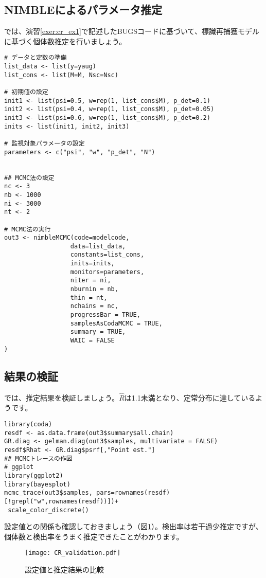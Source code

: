 	\subsection{NIMBLEによるパラメータ推定}
では、演習\ref{exer:cr_ex1}で記述したBUGSコードに基づいて、標識再捕獲モデルに基づく個体数推定を行いましょう。

\begin{verbatim}
# データと定数の準備
list_data <- list(y=yaug)
list_cons <- list(M=M, Nsc=Nsc)

# 初期値の設定
init1 <- list(psi=0.5, w=rep(1, list_cons$M), p_det=0.1)
init2 <- list(psi=0.4, w=rep(1, list_cons$M), p_det=0.05)
init3 <- list(psi=0.6, w=rep(1, list_cons$M), p_det=0.2)
inits <- list(init1, init2, init3)

# 監視対象パラメータの設定
parameters <- c("psi", "w", "p_det", "N")


## MCMC法の設定
nc <- 3
nb <- 1000
ni <- 3000
nt <- 2

# MCMC法の実行
out3 <- nimbleMCMC(code=modelcode,
                  data=list_data,
                  constants=list_cons,
                  inits=inits,
                  monitors=parameters,
                  niter = ni,
                  nburnin = nb,
                  thin = nt,
                  nchains = nc,
                  progressBar = TRUE,
                  samplesAsCodaMCMC = TRUE,
                  summary = TRUE,
                  WAIC = FALSE
)
\end{verbatim}

	\subsection{結果の検証}
では、推定結果を検証しましょう。$\hat{R}$は1.1未満となり、定常分布に達しているようです。
\begin{verbatim}
library(coda)
resdf <- as.data.frame(out3$summary$all.chain)
GR.diag <- gelman.diag(out3$samples, multivariate = FALSE)
resdf$Rhat <- GR.diag$psrf[,"Point est."]
## MCMCトレースの作図
# ggplot
library(ggplot2)
library(bayesplot)
mcmc_trace(out3$samples, pars=rownames(resdf)[!grepl("w",rownames(resdf))])+
 scale_color_discrete()
\end{verbatim}
設定値との関係も確認しておきましょう（図\ref{CR_validation}）。検出率は若干過少推定ですが、個体数と検出率をうまく推定できたことがわかります。
\begin{figure}[htb]
\begin{center}
\graphicspath{{4_hm/figs/}}
\texttt{[image: CR\_validation.pdf]}\\
\caption{設定値と推定結果の比較}
\label{CR_validation}
\end{center}
\end{figure}

